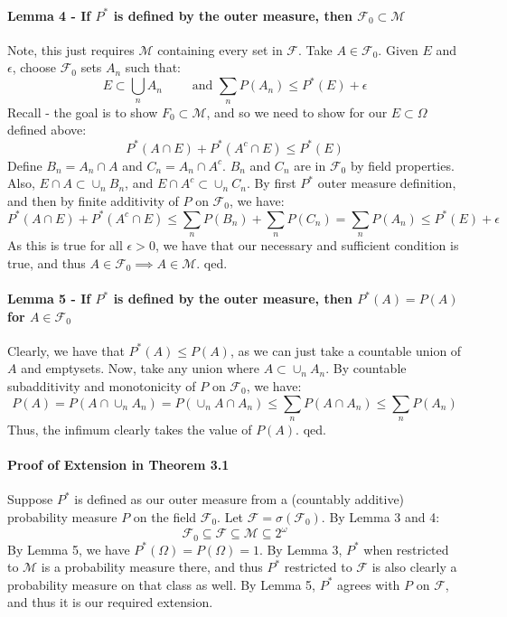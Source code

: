 \documentclass[12pt,a4paper]{article}
\newcommand{\1}[1]{\mathbbm{1}\left\{ #1 \right\}}
\newcommand{\fcal}{\mathcal{F}}
\newcommand{\mcal}{\mathcal{M}}
\begin{document}
\paragraph{Lemma 4 - If $P^*$ is defined by the outer measure, then $\fcal_0 \subset \mcal$} Note, this just requires $\mcal$ containing every set in $\fcal$. Take $A \in \fcal_0$. Given $E$ and $\epsilon$, choose $\fcal_0$ sets $A_n$ such that:
$$
	E \subset \bigcup_n A_n \quad\quad \text{ and } \sum_n P(A_n) \leq P^*(E) + \epsilon
$$
Recall - the goal is to show $F_0 \subset \mcal$, and so we need to show for our $E \subset \Omega$ defined above:
$$
	P^*(A \cap E) + P^*(A^c \cap E) \leq P^*(E)
$$
Define $B_n = A_n \cap A$ and $C_n = A_n \cap A^c$. $B_n$ and $C_n$ are in $\fcal_0$ by field properties. Also, $E \cap A \subset \cup_n B_n$, and $E \cap A^c \subset \cup_n C_n$. By first $P^*$ outer measure definition, and then by finite additivity of $P$ on $\fcal_0$, we have:
$$
	P^*(A \cap E) + P^*(A^c \cap E) \leq
	\sum_n P(B_n) + \sum_n P(C_n) =
	\sum_n P(A_n) \leq P^*(E) + \epsilon
$$
As this is true for all $\epsilon > 0$, we have that our necessary and sufficient condition is true, and thus $A \in \fcal_0 \implies A \in \mcal$. qed.

\paragraph{Lemma 5 - If $P^*$ is defined by the outer measure, then $P^*(A) = P(A)$ for $A \in \fcal_0$} Clearly, we have that $P^*(A) \leq P(A)$, as we can just take a countable union of $A$ and emptysets. Now, take any union where $A \subset \cup_n A_n$. By countable subadditivity and monotonicity of $P$ on $\fcal_0$, we have:
$$
	P(A) = P(A \cap \cup_n A_n) = P(\cup_n A \cap A_n) \leq \sum_n P(A \cap A_n) \leq \sum_n P(A_n)
$$
Thus, the infimum clearly takes the value of $P(A)$. qed.

\paragraph{Proof of Extension in Theorem 3.1} Suppose $P^*$ is defined as our outer measure from a (countably additive) probability measure $P$ on the field $\fcal_0$. Let $\fcal = \sigma(\fcal_0)$. By Lemma 3 and 4:
$$
	\fcal_0 \subseteq \fcal \subseteq \mcal \subseteq 2^{\omega}
$$
By Lemma 5, we have $P^*(\Omega) = P(\Omega) = 1$. By Lemma 3, $P^*$ when restricted to $\mcal$ is a probability measure there, and thus $P^*$ restricted to $\fcal$ is also clearly a probability measure on that class as well. By Lemma 5, $P^*$ agrees with $P$ on $\fcal$, and thus it is our required extension.
\end{document}
